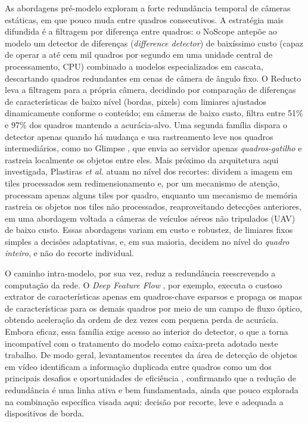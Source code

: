 \documentclass{ieeeaccess}
\begin{document}
As abordagens pré-modelo exploram a forte redundância temporal de câmeras
estáticas, em que pouco muda entre quadros consecutivos. A estratégia mais
difundida é a filtragem por diferença entre quadros: o NoScope
\cite{kang2017noscope} antepõe ao modelo um detector de diferenças (\textit{difference detector}) de
baixíssimo custo (capaz de operar a até cem mil quadros por segundo em uma unidade central de processamento, CPU)
combinado a modelos especializados em cascata, descartando quadros redundantes em
cenas de câmera de ângulo fixo. O Reducto \cite{li2020reducto} leva a filtragem
para a própria câmera,
decidindo por comparação de diferenças de características de baixo nível
(bordas, pixels) com limiares ajustados dinamicamente conforme o conteúdo; em
câmeras de baixo custo, filtra entre 51\% e 97\% dos quadros mantendo a
acurácia-alvo. Uma segunda família dispara o detector apenas
quando há mudança e usa rastreamento leve nos quadros intermediários, como no
Glimpse \cite{chen2015glimpse}, que envia ao servidor apenas
\textit{quadros-gatilho} e rastreia localmente os objetos entre eles. Mais
próximo da arquitetura aqui investigada, Plastiras \emph{et al.} \cite{plastiras2019selective}
atuam no nível dos recortes: dividem a
imagem em tiles processados sem redimensionamento e, por um mecanismo de
atenção, processam apenas alguns tiles por quadro, enquanto um mecanismo de
memória rastreia os objetos nos tiles não processados, reaproveitando detecções
anteriores, em uma abordagem voltada a câmeras de veículos aéreos não tripulados
(UAV) de baixo custo. Essas abordagens
variam em custo e robustez, de limiares fixos simples a decisões adaptativas,
e, em sua maioria, decidem no nível do \textit{quadro inteiro}, e não do
recorte individual.

O caminho intra-modelo, por sua vez, reduz a redundância reescrevendo a
computação da rede. O \textit{Deep Feature Flow} \cite{zhu2017dff}, por exemplo,
executa o custoso extrator de características apenas em quadros-chave esparsos e
propaga os mapas de características para os demais quadros por meio de um campo de
fluxo óptico, obtendo aceleração da ordem de dez vezes com pequena perda de
acurácia. Embora eficaz, essa família exige acesso ao interior do
detector, o que a torna incompatível com o tratamento do modelo como
caixa-preta adotado neste trabalho. De modo geral, levantamentos recentes da área
de detecção de objetos em vídeo identificam a informação duplicada entre quadros
como um dos principais desafios e oportunidades de eficiência
\cite{jiao2022vodsurvey}, confirmando que a redução de redundância é uma linha
ativa e bem fundamentada, ainda que pouco explorada na combinação específica
visada aqui: decisão por recorte, leve e adequada a dispositivos de borda.
\end{document}
